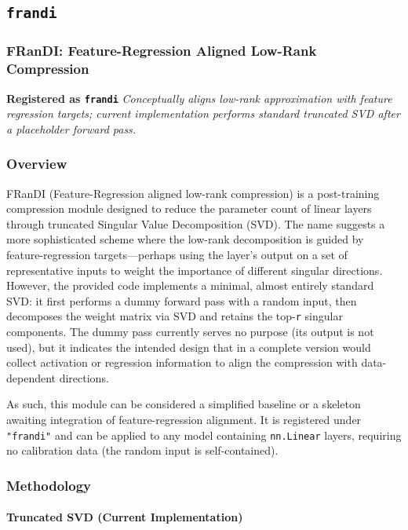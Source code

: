\subsection{\texttt{frandi}}
\subsubsection*{FRanDI: Feature-Regression Aligned Low-Rank Compression}

\textbf{Registered as \texttt{frandi}}
\textit{Conceptually aligns low-rank approximation with feature regression targets; current implementation performs standard truncated SVD after a placeholder forward pass.}


\subsubsection*{Overview}

FRanDI (Feature-Regression aligned low-rank compression) is a post-training compression module designed to reduce the parameter count of linear layers through truncated Singular Value Decomposition (SVD). The name suggests a more sophisticated scheme where the low-rank decomposition is guided by feature-regression targets---perhaps using the layer's output on a set of representative inputs to weight the importance of different singular directions. However, the provided code implements a minimal, almost entirely standard SVD: it first performs a dummy forward pass with a random input, then decomposes the weight matrix via SVD and retains the top-\texttt{r} singular components. The dummy pass currently serves no purpose (its output is not used), but it indicates the intended design that in a complete version would collect activation or regression information to align the compression with data-dependent directions.

As such, this module can be considered a simplified baseline or a skeleton awaiting integration of feature-regression alignment. It is registered under \texttt{"frandi"} and can be applied to any model containing \texttt{nn.Linear} layers, requiring no calibration data (the random input is self-contained).


\subsubsection*{Methodology}

\paragraph{Truncated SVD (Current Implementation)}

